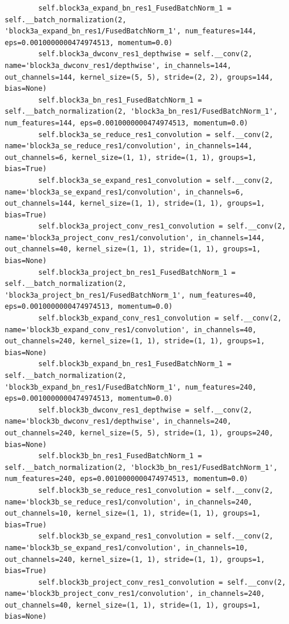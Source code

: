 \documentclass{fisatprojectfinal}
\begin{document}
\begin{appendices}
\begin{lstlisting}
        self.block3a_expand_bn_res1_FusedBatchNorm_1 = self.__batch_normalization(2, 'block3a_expand_bn_res1/FusedBatchNorm_1', num_features=144, eps=0.0010000000474974513, momentum=0.0)
        self.block3a_dwconv_res1_depthwise = self.__conv(2, name='block3a_dwconv_res1/depthwise', in_channels=144, out_channels=144, kernel_size=(5, 5), stride=(2, 2), groups=144, bias=None)
        self.block3a_bn_res1_FusedBatchNorm_1 = self.__batch_normalization(2, 'block3a_bn_res1/FusedBatchNorm_1', num_features=144, eps=0.0010000000474974513, momentum=0.0)
        self.block3a_se_reduce_res1_convolution = self.__conv(2, name='block3a_se_reduce_res1/convolution', in_channels=144, out_channels=6, kernel_size=(1, 1), stride=(1, 1), groups=1, bias=True)
        self.block3a_se_expand_res1_convolution = self.__conv(2, name='block3a_se_expand_res1/convolution', in_channels=6, out_channels=144, kernel_size=(1, 1), stride=(1, 1), groups=1, bias=True)
        self.block3a_project_conv_res1_convolution = self.__conv(2, name='block3a_project_conv_res1/convolution', in_channels=144, out_channels=40, kernel_size=(1, 1), stride=(1, 1), groups=1, bias=None)
        self.block3a_project_bn_res1_FusedBatchNorm_1 = self.__batch_normalization(2, 'block3a_project_bn_res1/FusedBatchNorm_1', num_features=40, eps=0.0010000000474974513, momentum=0.0)
        self.block3b_expand_conv_res1_convolution = self.__conv(2, name='block3b_expand_conv_res1/convolution', in_channels=40, out_channels=240, kernel_size=(1, 1), stride=(1, 1), groups=1, bias=None)
        self.block3b_expand_bn_res1_FusedBatchNorm_1 = self.__batch_normalization(2, 'block3b_expand_bn_res1/FusedBatchNorm_1', num_features=240, eps=0.0010000000474974513, momentum=0.0)
        self.block3b_dwconv_res1_depthwise = self.__conv(2, name='block3b_dwconv_res1/depthwise', in_channels=240, out_channels=240, kernel_size=(5, 5), stride=(1, 1), groups=240, bias=None)
        self.block3b_bn_res1_FusedBatchNorm_1 = self.__batch_normalization(2, 'block3b_bn_res1/FusedBatchNorm_1', num_features=240, eps=0.0010000000474974513, momentum=0.0)
        self.block3b_se_reduce_res1_convolution = self.__conv(2, name='block3b_se_reduce_res1/convolution', in_channels=240, out_channels=10, kernel_size=(1, 1), stride=(1, 1), groups=1, bias=True)
        self.block3b_se_expand_res1_convolution = self.__conv(2, name='block3b_se_expand_res1/convolution', in_channels=10, out_channels=240, kernel_size=(1, 1), stride=(1, 1), groups=1, bias=True)
        self.block3b_project_conv_res1_convolution = self.__conv(2, name='block3b_project_conv_res1/convolution', in_channels=240, out_channels=40, kernel_size=(1, 1), stride=(1, 1), groups=1, bias=None)

\end{lstlisting}
\end{appendices}
\end{document}
